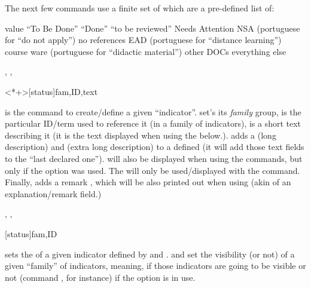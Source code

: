 \documentclass[article,nogeometry,english,tocdepth=3,secdepth=3]{ufrgscca} %
\begin{document}
The next few commands use a finite set of  which are a pre-defined list of:
\begin{describelist*}{value}
     { “To Be Done”}
     { “Done”}
     { “to be reviewed”}
     { Needs Attention}
     { NSA (portuguese for “do not apply”)}
     { no references}
     { EAD (portuguese for “distance learning”)}
     { course ware (portuguese for “didactic material”) }
     { other DOCs}
     { everything else}
\end{describelist*}

\begin{codedescribe}{\declareindicator, \indicatorDesc, \indicatorText}
	\begin{codesyntax}%
		\tsmacro{\declareindicator}<*+>[status]{fam,ID,text}
	\end{codesyntax}
\tsmacro{\declareindicator}{} is the command to create/define a given “indicator”.  set's its \emph{family} group,  is the particular ID/term used to reference it (in a family of indicators),  is a short text describing it (it is the text displayed when using the \tsmacro{\indref}{} below.). \tsmacro{\indicatorDesc}{} adds a  (long description) and  (extra long description) to a defined \tsmacro{\declareindicator}{} (it will add those text fields to the “last declared one”).  will also be displayed when using the \tsmacro{\indref}{} commands, but only if the  option was used. The  will only be used/displayed with the \tsmacro{\PrintIndicators}{} command. Finally,  adds a remark , which will be also printed out when using  \tsmacro{\lstind}{} (akin of an explanation/remark field.)
\end{codedescribe}

\begin{codedescribe}{\indsetstatus, \indsetview, \indsethide}
	\begin{codesyntax}%
	\tsmacro{\indsetstatus}[status]{fam,ID}
	\tsmacro{\indsetview}{fam}
	\tsmacro{\indsethide}{fam}
\end{codesyntax}
 sets the  of a given indicator defined by  and . \tsmacro{\indsetview}{} and  set the visibility (or not) of a given “family” of indicators, meaning, if those indicators are going to be visible or not (command \tsmacro{\indref}{}, for instance) if the option  is in use.
\end{codedescribe}
\end{document}
